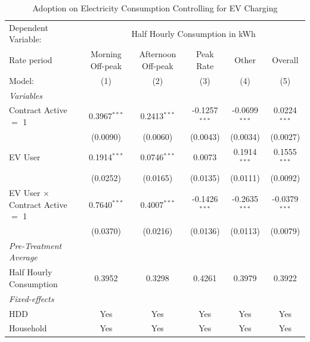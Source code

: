 
\begin{table}[htbp]
   \caption{\label{tab:hp-did-ev} Adoption on Electricity Consumption Controlling for EV Charging}
   \centering
   \begin{tabular}{lccccc}
      \tabularnewline \midrule \midrule
      Dependent Variable: & \multicolumn{5}{c}{Half Hourly Consumption in kWh}\\
      Rate period                             & Morning Off-peak & Afternoon Off-peak & Peak Rate       & Other           & Overall \\   
      Model:                                  & (1)              & (2)                & (3)             & (4)             & (5)\\  
      \midrule
      \emph{Variables}\\
      Contract Active $=$ 1                   & 0.3967$^{***}$   & 0.2413$^{***}$     & -0.1257$^{***}$ & -0.0699$^{***}$ & 0.0224$^{***}$\\   
                                              & (0.0090)         & (0.0060)           & (0.0043)        & (0.0034)        & (0.0027)\\   
      EV User                                 & 0.1914$^{***}$   & 0.0746$^{***}$     & 0.0073          & 0.1914$^{***}$  & 0.1555$^{***}$\\   
                                              & (0.0252)         & (0.0165)           & (0.0135)        & (0.0111)        & (0.0092)\\   
      EV User $\times$ Contract Active $=$ 1  & 0.7640$^{***}$   & 0.4007$^{***}$     & -0.1426$^{***}$ & -0.2635$^{***}$ & -0.0379$^{***}$\\   
                                              & (0.0370)         & (0.0216)           & (0.0136)        & (0.0113)        & (0.0079)\\   
\midrule
\emph{Pre-Treatment Average}\\
      Half Hourly Consumption                 & 0.3952           & 0.3298             & 0.4261          & 0.3979          & 0.3922\\  
      \midrule
      \emph{Fixed-effects}\\
      HDD                                     & Yes              & Yes                & Yes             & Yes             & Yes\\  
      Household                               & Yes              & Yes                & Yes             & Yes             & Yes\\  

\end{tabular}
\end{table}
